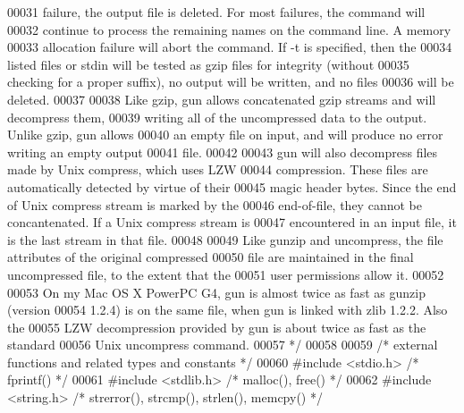 \begin{DoxyCode}
00031 \textcolor{comment}{   failure, the output file is deleted.  For most failures, the command will}
00032 \textcolor{comment}{   continue to process the remaining names on the command line.  A memory}
00033 \textcolor{comment}{   allocation failure will abort the command.  If -t is specified, then the}
00034 \textcolor{comment}{   listed files or stdin will be tested as gzip files for integrity (without}
00035 \textcolor{comment}{   checking for a proper suffix), no output will be written, and no files}
00036 \textcolor{comment}{   will be deleted.}
00037 \textcolor{comment}{}
00038 \textcolor{comment}{   Like gzip, gun allows concatenated gzip streams and will decompress them,}
00039 \textcolor{comment}{   writing all of the uncompressed data to the output.  Unlike gzip, gun allows}
00040 \textcolor{comment}{   an empty file on input, and will produce no error writing an empty output}
00041 \textcolor{comment}{   file.}
00042 \textcolor{comment}{}
00043 \textcolor{comment}{   gun will also decompress files made by Unix compress, which uses LZW}
00044 \textcolor{comment}{   compression.  These files are automatically detected by virtue of their}
00045 \textcolor{comment}{   magic header bytes.  Since the end of Unix compress stream is marked by the}
00046 \textcolor{comment}{   end-of-file, they cannot be concantenated.  If a Unix compress stream is}
00047 \textcolor{comment}{   encountered in an input file, it is the last stream in that file.}
00048 \textcolor{comment}{}
00049 \textcolor{comment}{   Like gunzip and uncompress, the file attributes of the original compressed}
00050 \textcolor{comment}{   file are maintained in the final uncompressed file, to the extent that the}
00051 \textcolor{comment}{   user permissions allow it.}
00052 \textcolor{comment}{}
00053 \textcolor{comment}{   On my Mac OS X PowerPC G4, gun is almost twice as fast as gunzip (version}
00054 \textcolor{comment}{   1.2.4) is on the same file, when gun is linked with zlib 1.2.2.  Also the}
00055 \textcolor{comment}{   LZW decompression provided by gun is about twice as fast as the standard}
00056 \textcolor{comment}{   Unix uncompress command.}
00057 \textcolor{comment}{ */}
00058 
00059 \textcolor{comment}{/* external functions and related types and constants */}
00060 \textcolor{preprocessor}{#include <stdio.h>}          \textcolor{comment}{/* fprintf() */}
00061 \textcolor{preprocessor}{#include <stdlib.h>}         \textcolor{comment}{/* malloc(), free() */}
00062 \textcolor{preprocessor}{#include <string.h>}         \textcolor{comment}{/* strerror(), strcmp(), strlen(), memcpy() */}

\end{DoxyCode}
